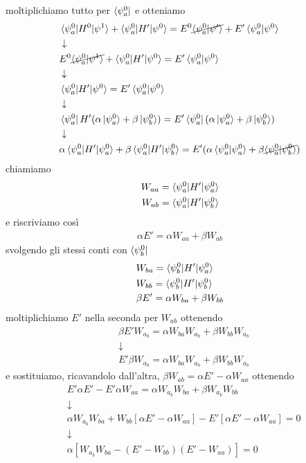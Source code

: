 moltiplichiamo tutto per $\bra{\psi_a^0}$ e otteniamo
\begin{align}
{}&\braket{\psi_a^0|H^0|\psi^1} + \braket{\psi_a^0|H'|\psi^0} = E^0 \cancel{\braket{\psi_a^0|\psi'}} + E'\braket{\psi_a^0|\psi^0}\\
&\downarrow \nonumber \\
&E^0\cancel{\braket{\psi_a^0|\psi^1}} + \braket{\psi_a^0|H'|\psi^0} =  E'\braket{\psi_a^0|\psi^0}\\
&\downarrow \nonumber \\
&\braket{\psi_a^0|H'|\psi^0} =  E'\braket{\psi_a^0|\psi^0}\\
&\downarrow \nonumber \\
&\bra{\psi_a^0}H'(\alpha \ket{\psi^0_a} + \beta \ket{\psi^0_b})= E'\bra{\psi_a^0}(\alpha \ket{\psi^0_a} + \beta \ket{\psi^0_b}) \\
&\downarrow \nonumber \\
&\alpha \braket{\psi_a^0 |H'|\psi_a^0} + \beta\braket{\psi_a^0 |H'|\psi_b^0} = E' ( \alpha \braket{\psi_a^0|\psi_a^0} + \beta \cancel{\braket{\psi_a^0|\psi_b^0}} )
\end{align}
chiamiamo
\begin{align}
W_{aa}= \braket{\psi_a^0 |H'|\psi_a^0} \\
W_{ab}= \braket{\psi_a^0 |H'|\psi_b^0}
\end{align}
e riscriviamo così
\begin{align}
\alpha E' = \alpha W_{aa} + \beta W_{ab}
\end{align}
svolgendo gli stessi conti con $\bra{\psi_b^0}$
\begin{align}
{}&W_{ba}= \braket{\psi_b^0 |H'|\psi_a^0} \\
&W_{bb}= \braket{\psi_b^0 |H'|\psi_b^0}\\
&\beta E' = \alpha W_{ba} + \beta W_{bb}
\end{align}
moltiplichiamo $E'$ nella seconda per $W_{ab}$ ottenendo
\begin{align}
{}&\beta E' W_{a_b} = \alpha W_{ba}W_{a_b} + \beta W_{bb}W_{a_b} \\
&\downarrow \nonumber \\
&E' \beta  W_{a_b} = \alpha W_{ba}W_{a_b} + \beta W_{bb}W_{a_b}
\end{align}
e sostituiamo, ricavandolo dall'altra, $\beta W_{ab}= \alpha E' - \alpha W_{aa}$ ottenendo
\begin{align}
{}&E' \alpha E' - E'\alpha W_{aa} = \alpha W_{a_b}W_{ba} + \beta W_{a_b}W_{bb} \\
&\downarrow \nonumber \\
&\alpha W_{a_b}W_{ba} + W_{bb}[\alpha E' - \alpha W_{aa}] - E'[\alpha E' - \alpha W_{aa}]=0 \\
&\downarrow \nonumber \\
& \alpha [W_{a_b}W_{ba} - (E'-W_{bb})(E' - W_{aa})] =0
\end{align}

